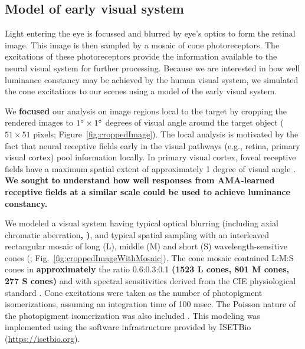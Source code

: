 \documentclass{jov}
\providecommand{\DIFaddtex}[1]{{\bf #1}} %
\providecommand{\DIFdeltex}[1]{} %
\providecommand{\DIFaddbegin}{} %
\providecommand{\DIFaddend}{} %
\providecommand{\DIFdelbegin}{} %
\providecommand{\DIFdelend}{} %
\providecommand{\DIFadd}[1]{\texorpdfstring{\DIFaddtex{#1}}{#1}} %
\providecommand{\DIFdel}[1]{\texorpdfstring{\DIFdeltex{#1}}{}} %
\newcommand{\DIFscaledelfig}{0.5}
\newlength{\DIFdelgraphicswidth} %
\newlength{\DIFdelgraphicsheight} %
\newcommand{\DIFaddincludegraphics}[2][]{{\color{blue}\fbox{\DIFOincludegraphics[#1]{#2}}}} %
\newcommand{\DIFdelincludegraphics}[2][]{%
\sbox{\DIFdelgraphicsbox}{\DIFOincludegraphics[#1]{#2}}%
\settoboxwidth{\DIFdelgraphicswidth}{\DIFdelgraphicsbox} %
\settoboxtotalheight{\DIFdelgraphicsheight}{\DIFdelgraphicsbox} %
\scalebox{\DIFscaledelfig}{%
\parbox[b]{\DIFdelgraphicswidth}{\usebox{\DIFdelgraphicsbox}\\[-\baselineskip] \rule{\DIFdelgraphicswidth}{0em}}\llap{\resizebox{\DIFdelgraphicswidth}{\DIFdelgraphicsheight}{%
\setlength{\unitlength}{\DIFdelgraphicswidth}%
\begin{picture}(1,1)%
\thicklines\linethickness{2pt} %
{\color[rgb]{1,0,0}\put(0,0){\framebox(1,1){}}}%
{\color[rgb]{1,0,0}\put(0,0){\line( 1,1){1}}}%
{\color[rgb]{1,0,0}\put(0,1){\line(1,-1){1}}}%
\end{picture}%
}\hspace*{3pt}}} %
} %
\DeclareRobustCommand{\DIFaddbegin}{\DIFOaddbegin \let\includegraphics\DIFaddincludegraphics} %
\DeclareRobustCommand{\DIFaddend}{\DIFOaddend \let\includegraphics\DIFOincludegraphics} %
\DeclareRobustCommand{\DIFdelbegin}{\DIFOdelbegin \let\includegraphics\DIFdelincludegraphics} %
\DeclareRobustCommand{\DIFdelend}{\DIFOaddend \let\includegraphics\DIFOincludegraphics} %
\begin{document}
\subsection{Model of early visual system} \label{method:Isetbio}
Light entering the eye is focussed and blurred by eye's optics to form the retinal image.
This image is then sampled by a mosaic of cone photoreceptors.
The excitations of these photoreceptors provide the information available to the neural visual system for further processing.
Because we are interested in how well luminance constancy may be achieved by the human visual system, we simulated the cone excitations
to our scenes using a model of the early visual system.

We \DIFdelbegin \DIFdel{focussed }\DIFdelend \DIFaddbegin \DIFadd{focused }\DIFaddend our analysis on image regions local to the target by cropping the rendered images to \DIFdelbegin \DIFdel{$1 \times 1$ }\DIFdelend \DIFaddbegin \DIFadd{$1\degree \times 1\degree$ }\DIFaddend degrees of visual angle around the target object ($51 \times 51$ pixels; Figure~\ref{fig:croppedImage}).
The local analysis is motivated by the fact that neural receptive fields early in the visual pathways (e.g., retina, primary visual cortex) pool information locally. 
In primary visual cortex, foveal receptive fields have a maximum spatial extent of approximately 1 degree of visual angle \cite{gattass1981visual, gattass1988visuotopic}. 
\DIFaddbegin \DIFadd{We sought to understand how well responses from AMA-learned receptive fields at a similar scale could be used to achieve luminance constancy.
}\DIFaddend 

We modeled a visual system having typical optical blurring (including axial chromatic aberration\DIFdelbegin \DIFdel{)\cite{marimont1994matching}}\DIFdelend \DIFaddbegin \DIFadd{, )}\DIFaddend , and typical spatial sampling with an interleaved rectangular mosaic of long (L), middle (M)  and short (S) wavelength-sensitive cones (; Fig.~\ref{fig:croppedImageWithMosaic}). 
The cone mosaic contained L:M:S cones in \DIFaddbegin \DIFadd{approximately }\DIFaddend the ratio 0.6:0.3:0.1 \DIFaddbegin \DIFadd{(1523 L cones, 801 M cones, 277 S cones) }\DIFaddend and with spectral sensitivities derived from the CIE physiological standard \cite{CIE86}.
Cone excitations were taken as the number of photopigment isomerizations, assuming an integration time of 100 msec. 
The Poisson nature of the photopigment isomerization was also included \cite{hecht1942energy}. 
This modeling was implemented using the software infrastructure provided by ISETBio (\href{https://isetbio.org}{https://isetbio.org}).
\end{document}
